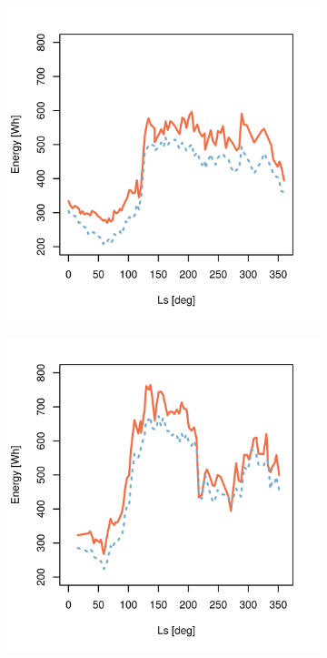 \begin{figure}[h]
\begin{subfigure}[t]{\subfigureWidth}
		\includegraphics[height=\graphicsHeight]{sections/appendix/B/plots/predicted-vs-measured-energy-my30-adjusted.png}
		\label{fig:plot:sub:mer-energy-production-predicted-vs-reported-my30-adjusted}
	\end{subfigure}\hfill
    \begin{subfigure}[t]{\subfigureWidth}
        \centering
		\includegraphics[height=\graphicsHeight]{sections/appendix/B/plots/predicted-vs-measured-energy-my32-adjusted.png}

\end{subfigure}
\end{figure}
